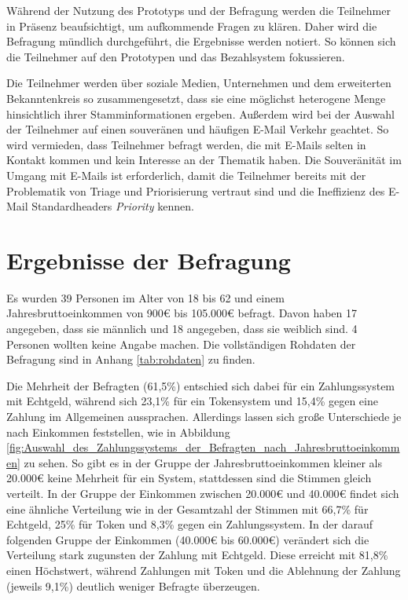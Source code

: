 Während der Nutzung des Prototyps und der Befragung werden die Teilnehmer in Präsenz beaufsichtigt, um aufkommende Fragen zu klären. Daher wird die Befragung mündlich durchgeführt, die Ergebnisse werden notiert. So können sich die Teilnehmer auf den Prototypen und das Bezahlsystem fokussieren.

\noindent Die Teilnehmer werden über soziale Medien, Unternehmen und dem erweiterten Bekanntenkreis so zusammengesetzt, dass sie eine möglichst heterogene Menge hinsichtlich ihrer Stamminformationen ergeben. Außerdem wird bei der Auswahl der Teilnehmer auf einen souveränen und häufigen E-Mail Verkehr geachtet. So wird vermieden, dass Teilnehmer befragt werden, die mit E-Mails selten in Kontakt kommen und kein Interesse an der Thematik haben. Die Souveränität im Umgang mit E-Mails ist erforderlich, damit die Teilnehmer bereits mit der Problematik von Triage und Priorisierung vertraut sind und die Ineffizienz des E-Mail Standardheaders \textit{Priority} kennen.

\section{Ergebnisse der Befragung}
\label{Ergebnisse_der_Befragung}
Es wurden 39 Personen im Alter von 18 bis 62 und einem Jahresbruttoeinkommen von 900€ bis 105.000€ befragt. Davon haben 17 angegeben, dass sie männlich und 18 angegeben, dass sie weiblich sind. 4 Personen wollten keine Angabe machen. Die vollständigen Rohdaten der Befragung sind in Anhang \ref{tab:rohdaten} zu finden.

Die Mehrheit der Befragten (61,5\%) entschied sich dabei für ein Zahlungssystem mit Echtgeld, während sich 23,1\% für ein Tokensystem und 15,4\% gegen eine Zahlung im Allgemeinen aussprachen. Allerdings lassen sich große Unterschiede je nach Einkommen feststellen, wie in Abbildung \ref{fig:Auswahl_des_Zahlungssystems_der_Befragten_nach_Jahresbruttoeinkommen} zu sehen. So gibt es in der Gruppe der Jahresbruttoeinkommen kleiner als 20.000€ keine Mehrheit für ein System, stattdessen sind die Stimmen gleich verteilt. In der Gruppe der Einkommen zwischen 20.000€ und 40.000€ findet sich eine ähnliche Verteilung wie in der Gesamtzahl der Stimmen mit 66,7\% für Echtgeld, 25\% für Token und 8,3\% gegen ein Zahlungssystem. In der darauf folgenden Gruppe der Einkommen (40.000€ bis 60.000€) verändert sich die Verteilung stark zugunsten der Zahlung mit Echtgeld. Diese erreicht mit 81,8\% einen Höchstwert, während Zahlungen mit Token und die Ablehnung der Zahlung (jeweils 9,1\%) deutlich weniger Befragte überzeugen.

